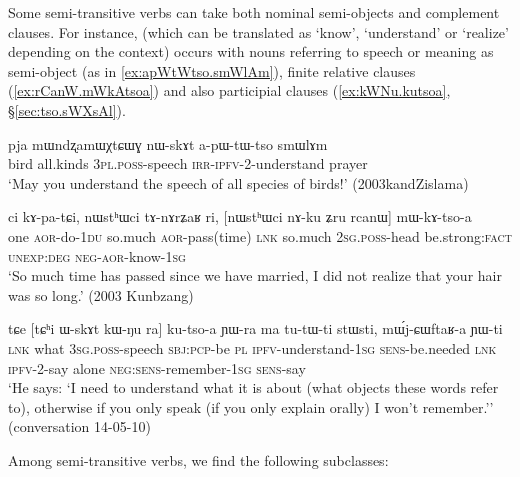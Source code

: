 Some semi-transitive verbs can take both nominal semi-objects and complement clauses. For instance,  (which can be translated as `know', `understand' or `realize' depending on the context) occurs with nouns referring to speech or meaning as semi-object (as in \ref{ex:apWtWtso.smWlAm}), finite relative clauses (\ref{ex:rCanW.mWkAtsoa}) and also participial clauses (\ref{ex:kWNu.kutsoa}, §\ref{sec:tso.sWXsAl}).

\begin{exe}
\ex \label{ex:apWtWtso.smWlAm}
\gll pja mɯndʐamɯχtɕɯɣ nɯ-skɤt a-pɯ-tɯ-tso smɯlɤm\\
bird all.kinds \textsc{3pl}.\textsc{poss}-speech \textsc{irr}-\textsc{ipfv}-2-understand prayer\\
\glt `May you understand the speech of all species of birds!' (2003kandZislama)
\end{exe}

\begin{exe}
\ex   \label{ex:rCanW.mWkAtsoa}
 \gll ci kɤ-pa-tɕi, nɯstʰɯci tɤ-nɤrʑaʁ ri, [nɯstʰɯci nɤ-ku ʑru rcanɯ] mɯ-kɤ-tso-a \\
 one \textsc{aor}-do-\textsc{1du} so.much \textsc{aor}-pass(time) \textsc{lnk} so.much \textsc{2sg}.\textsc{poss}-head be.strong:\textsc{fact} \textsc{unexp}:\textsc{deg} \textsc{neg}-\textsc{aor}-know-\textsc{1sg} \\
\glt `So much time has passed since we have married, I did not realize that your hair was so long.' (2003 Kunbzang)
\end{exe}

\begin{exe}
\ex   \label{ex:kWNu.kutsoa}
 \gll  tɕe [tɕʰi ɯ-skɤt kɯ-ŋu ra] ku-tso-a ɲɯ-ra ma tu-tɯ-ti stɯsti, mɯ́j-ɕɯftaʁ-a ɲɯ-ti \\
\textsc{lnk} what \textsc{3sg}.\textsc{poss}-speech \textsc{sbj}:\textsc{pcp}-be \textsc{pl} \textsc{ipfv}-understand-\textsc{1sg} \textsc{sens}-be.needed \textsc{lnk} \textsc{ipfv}-2-say alone \textsc{neg}:\textsc{sens}-remember-\textsc{1sg} \textsc{sens}-say \\
 \glt `He says: `I need to understand what it is about (what objects these words refer to), otherwise if you only speak (if you only explain orally) I won't remember.'' (conversation 14-05-10)
\end{exe}
Among semi-transitive verbs, we find the following subclasses:

